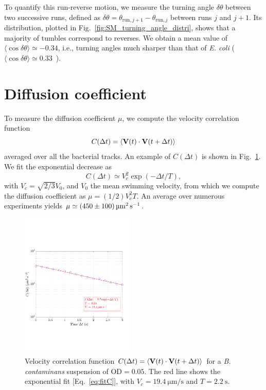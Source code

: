 \documentclass[aps,a4paper,twocolumn,10pt,pre,showpacs]{revtex4-2}
\begin{document}
To quantify this run-reverse motion, we measure the turning angle $\delta\theta$ between two successive runs, defined as $\delta \theta = \theta_{\mathrm{run}, j+1} - \theta_{\mathrm{run},j}$ between runs $j$ and $j+1$. Its distribution, plotted in Fig.~\ref{fig:SM_turning_angle_distri}, shows that a majority of tumbles correspond to reverses. We obtain a mean value of $\langle\cos\delta\theta\rangle\simeq -0.34$, i.e., turning angles much sharper than that of \emph{E. coli} ($\langle\cos\delta\theta\rangle\simeq 0.33$~\cite{berg1993random}).



\section{Diffusion coefficient}
\label{sec:SM_mu}

To measure the diffusion coefficient $\mu$, we compute the velocity correlation function~\cite{lovely1975statistical,taktikos2013motility,lauga2020}
\begin{equation}
    C(\Delta t) = \langle {\bf V}(t) \cdot {\bf V} (t+\Delta t) \rangle
\end{equation}
averaged over all the bacterial tracks.  An example of $C(\Delta t)$ is shown in Fig.~\ref{fig:mu_correlation}. We fit the exponential decrease as  \begin{equation}
 C(\Delta t) \simeq V_c^2 \exp(-\Delta t/T),
 \label{eq:fitC}
\end{equation}
with $V_c = \sqrt{2/3} V_0$, and $V_0$ the mean swimming velocity,
from which we compute the diffusion coefficient as $\mu=(1/2) V_c^2 T$. An average over numerous experiments yields $\mu \simeq \SI{450\pm100}{\square\um\per\s}$.

\begin{figure}[b]
\includegraphics[trim = 0mm 57mm 13mm 64mm, clip, width=0.48\textwidth, angle=0]{FigAC.pdf} 
\caption{Velocity correlation function $C(\Delta t) = \langle {\bf V}(t) \cdot {\bf V} (t+\Delta t) \rangle$ for a \emph{B. contaminans} suspension of $\mathrm{OD}=0.05$. The red line shows the exponential fit [Eq.~\eqref{eq:fitC}], with $V_c=\SI{19.4}{\um\per\s}$ and $T=\SI{2.2}{\s}$.}
\label{fig:mu_correlation}
\end{figure}
\end{document}
